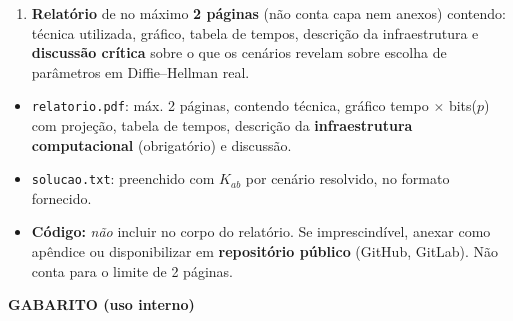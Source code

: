 \documentclass[12pt,a4paper]{article}
\newif\ifmostrarrespostas
\begin{document}
\begin{enumerate}
  \item \textbf{Relatório} de no máximo \textbf{2 páginas} (não conta capa nem anexos) contendo: técnica utilizada, gráfico, tabela de tempos, descrição da infraestrutura e \textbf{discussão crítica} sobre o que os cenários revelam sobre escolha de parâmetros em Diffie--Hellman real.
\end{enumerate}

\begin{tcolorbox}[colback=yellow!12, colframe=yellow!60!brown, title=\textbf{Entregáveis}, fonttitle=\small]
\small
\begin{itemize}[nosep]
  \item \texttt{relatorio.pdf}: máx. 2 páginas, contendo técnica, gráfico tempo $\times$ bits($p$) com projeção, tabela de tempos, descrição da \textbf{infraestrutura computacional} (obrigatório) e discussão.
  \item \texttt{solucao.txt}: preenchido com $K_{ab}$ por cenário resolvido, no formato fornecido.
  \item \textbf{Código:} \emph{não} incluir no corpo do relatório. Se imprescindível, anexar como apêndice ou disponibilizar em \textbf{repositório público} (GitHub, GitLab). Não conta para o limite de 2 páginas.
\end{itemize}
\end{tcolorbox}

\ifmostrarrespostas

\newpage
\begin{center}
\Large\textbf{GABARITO (uso interno)}
\end{center}
\vspace{0.2in}
\end{document}
